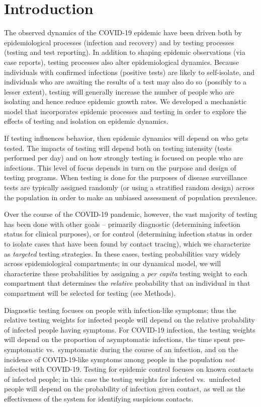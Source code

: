 \documentclass[12pt]{article}
\newcommand{\percap}{\emph{per capita}\xspace}
\newcommand{\covid}{COVID-19\xspace}
\DeclareRobustCommand\_{\ifmmode\expandafter\subtxt\else\textunderscore\fi}
\theoremstyle{definition} %
\begin{document}
\section{Introduction}

The observed dynamics of the \covid epidemic have been driven both by epidemiological processes (infection and recovery) and by testing processes (testing and test reporting). In addition to shaping epidemic observations (via case reports), testing processes also alter epidemiological dynamics. Because individuals with confirmed infections (positive tests) are likely to self-isolate, and individuals who are awaiting the results of a test may also do so (possibly to a lesser extent), testing will generally increase the number of people who are isolating and hence reduce epidemic growth rates. We developed a mechanistic model that incorporates epidemic processes and testing in order to explore the effects of testing and isolation on epidemic dynamics.

If testing influences behavior, then epidemic dynamics will depend on who gets tested.
The impacts of testing will depend both on testing intensity (tests performed per day) and on how strongly testing is focused on people who are infectious.
This level of focus depends in turn on the purpose and design of testing programs. 
When testing is done for the purposes of disease surveillance \citep{foddai2020base}
tests are typically assigned randomly (or using a stratified random design) across the population in
order to make an unbiased assessment of population prevalence.

Over the course of the \covid pandemic, however, the vast majority of testing has been done with other goals --
primarily diagnostic (determining infection status for clinical purposes), or for control (determining  infection status in order to isolate cases that have been found by contact tracing), which we characterize as \emph{targeted} testing strategies.
In these cases, testing probabilities vary widely across epidemiological compartments; in our dynamical model, we will characterize these probabilities by assigning a \percap testing weight to each compartment that determines the \emph{relative} probability that an individual in that compartment will be selected for testing (see Methods). 

Diagnostic testing focuses on people with infection-like symptoms; thus the relative testing weights for infected people will depend on the relative probability of infected people having symptoms. For \covid infection, the testing weights will depend on the proportion of asymptomatic infections, the time spent pre-symptomatic vs.\ symptomatic during the course of an infection, and on the incidence of \covid-like symptoms among people in the population \emph{not} infected with \covid. Testing for epidemic control focuses on known contacts of infected people; in this case the testing weights for infected vs.\ uninfected people will depend on the probability of infection given contact, as well as the effectiveness of the system for identifying suspicious contacts.
\end{document}
